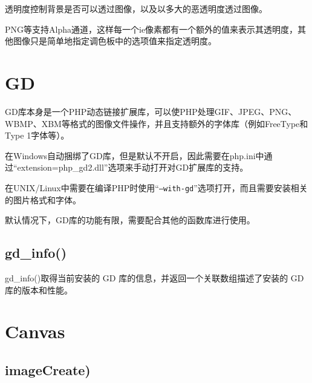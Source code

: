 透明度控制背景是否可以透过图像，以及以多大的恶透明度透过图像。

PNG等支持Alpha通道，这样每一个ie像素都有一个额外的值来表示其透明度，其他图像只是简单地指定调色板中的选项值来指定透明度。







\section{GD}


GD库本身是一个PHP动态链接扩展库，可以使PHP处理GIF、JPEG、PNG、WBMP、XBM等格式的图像文件操作，并且支持额外的字体库（例如FreeType和Type 1字体等）。



在Windows自动捆绑了GD库，但是默认不开启，因此需要在php.ini中通过“extension=php\_gd2.dll”选项来手动打开对GD扩展库的支持。

在UNIX/Linux中需要在编译PHP时使用“\texttt{--with-gd}”选项打开，而且需要安装相关的图片格式和字体。


默认情况下，GD库的功能有限，需要配合其他的函数库进行使用。


\subsection{gd\_info()}


gd\_info()取得当前安装的 GD 库的信息，并返回一个关联数组描述了安装的 GD 库的版本和性能。



\section{Canvas}


\subsection{imageCreate)}


\begin{lstlisting}[language=PHP]

\end{lstlisting}




\begin{lstlisting}[language=PHP]

\end{lstlisting}





